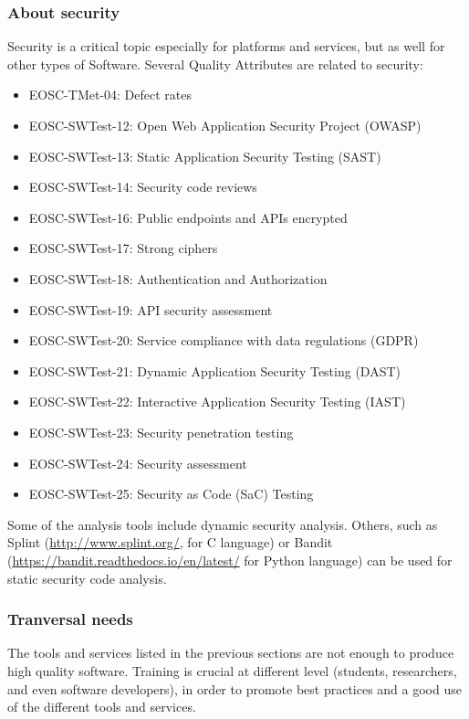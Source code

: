 \subsubsection{About security}

Security is a critical topic especially for platforms and services, but as well for other types of Software. Several Quality Attributes are related to security:

\begin{itemize}
  \item EOSC-TMet-04: Defect rates
  \item EOSC-SWTest-12: Open Web Application Security Project (OWASP)
  \item EOSC-SWTest-13: Static Application Security Testing (SAST)
  \item EOSC-SWTest-14: Security code reviews
  \item EOSC-SWTest-16: Public endpoints and APIs encrypted
  \item EOSC-SWTest-17: Strong ciphers
  \item EOSC-SWTest-18: Authentication and Authorization
  \item EOSC-SWTest-19: API security assessment
  \item EOSC-SWTest-20: Service compliance with data regulations (GDPR)
  \item EOSC-SWTest-21: Dynamic Application Security Testing (DAST)
  \item EOSC-SWTest-22: Interactive Application Security Testing (IAST)
  \item EOSC-SWTest-23: Security penetration testing
  \item EOSC-SWTest-24: Security assessment
  \item EOSC-SWTest-25: Security as Code (SaC) Testing
\end{itemize}

Some of the analysis tools include dynamic security analysis. Others, such as Splint (\url{http://www.splint.org/}, for C language) or  Bandit (\url{https://bandit.readthedocs.io/en/latest/} for Python language) can be used for static security code analysis.

\subsubsection{Tranversal needs}

The tools and services listed in the previous sections are not enough to produce high quality software. Training is crucial at different level (students, researchers, and even software developers), in order to promote best practices and a good use of the different tools and services.

